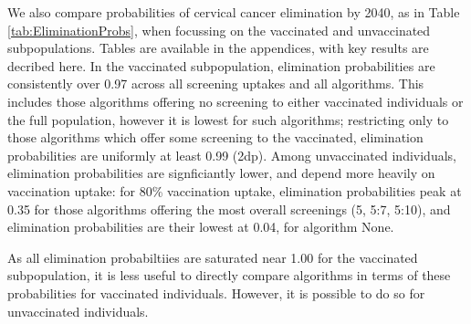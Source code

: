 We also compare probabilities of cervical cancer elimination by 2040, as in Table \ref{tab:EliminationProbs}, when focussing on the vaccinated and unvaccinated subpopulations. Tables are available in the appendices, with key results are decribed here. In the vaccinated subpopulation, elimination probabilities are consistently over 0.97 across all screening uptakes and all algorithms. This includes those algorithms offering no screening to either vaccinated individuals or the full population, however it is lowest for such algorithms; restricting only to those algorithms which offer some screening to the vaccinated, elimination probabilities are uniformly at least 0.99 (2dp). Among unvaccinated individuals, elimination probabilities are signficiantly lower, and depend more heavily on vaccination uptake: for 80\% vaccination uptake, elimination probabilities peak at 0.35 for those algorithms offering the most overall screenings (5, 5:7, 5:10), and elimination probabilities are their lowest at 0.04, for algorithm None.

As all elimination probabiltiies are saturated near 1.00 for the vaccinated subpopulation, it is less useful to directly compare algorithms in terms of these probabilities for vaccinated individuals. However, it is possible to do so for unvaccinated individuals.

